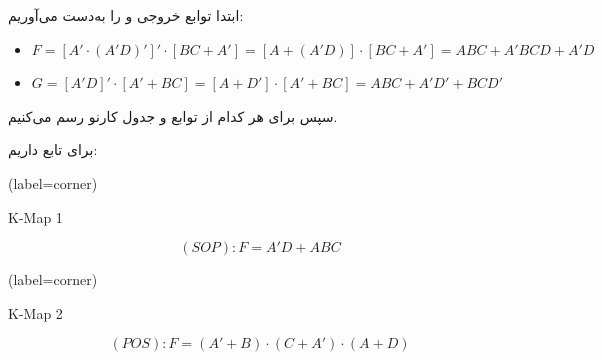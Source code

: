 ابتدا توابع خروجی  و  را به‌دست می‌آوریم:

\begin{latin}
	\begin{itemize}
		\item 
		$ F=[A'\cdot (A'D)']' \cdot [BC + A'] = [A + (A'D)] \cdot [BC + A'] = ABC + A'BCD + A'D$
		
		\item 
		$ G=[A'D]' \cdot [A' + BC] = [A + D'] \cdot [A' + BC] = ABC + A'D' + BCD' $
	\end{itemize}
\end{latin}

سپس برای هر کدام از توابع  و  جدول کارنو رسم می‌کنیم.

برای تابع  داریم:


\begin{latin}
	\begin{minipage}{0.48\textwidth}
		\centering
		\begin{karnaugh-map}[4][4][1][$B$][$A$][$D$][$C$](label=corner)
		\end{karnaugh-map}
		\caption{K-Map 1}
		$$ (SOP):F=A'D + ABC $$
	\end{minipage}
	\hfill
	\begin{minipage}{0.48\textwidth}
		\centering
		\begin{karnaugh-map}[4][4][1][$B$][$A$][$D$][$C$](label=corner)
		\end{karnaugh-map}
		\caption{K-Map 2}
		$$ (POS):F=(A'+B) \cdot (C+A') \cdot (A+D) $$
	\end{minipage}	
\end{latin}




